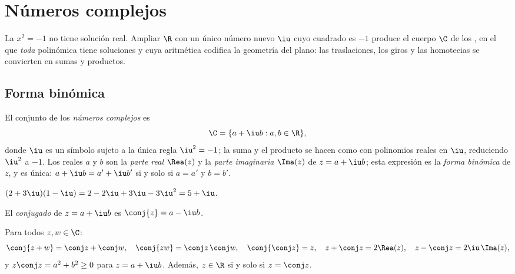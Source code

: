 \chapter{Números complejos}\label{ch:g12:complex}

La  $x^2 = -1$ no tiene solución real. Ampliar $\R$ con un único
número nuevo $\iu$ cuyo cuadrado es $-1$ produce el cuerpo $\C$ de los
, en el que \emph{toda}  polinómica tiene
soluciones y cuya aritmética codifica la geometría del plano: las
traslaciones, los giros y las homotecias se convierten en sumas y
productos.

\section{Forma binómica}

\begin{definition}\label{def:g12:complex:def}
El conjunto de los \emph{números complejos} es
\[
\C = \{a + \iu b : a, b \in \R\},
\]
donde $\iu$ es un símbolo sujeto a la única regla $\iu^2 = -1$; la suma y el
producto se hacen como con polinomios reales en $\iu$, reduciendo $\iu^2$ a
$-1$. Los reales $a$ y $b$ son la \emph{parte real}
$\Rea(z)$ y la \emph{parte imaginaria} $\Ima(z)$ de
$z = a + \iu b$; esta expresión es la \emph{forma binómica} de $z$, y es única: $a + \iu b = a' + \iu b'$ si y solo si
$a = a'$ y $b = b'$.
\end{definition}

\begin{example}
$(2 + 3\iu)(1 - \iu) = 2 - 2\iu + 3\iu - 3\iu^2 = 5 + \iu$.
\end{example}

\begin{definition}[Conjugado]\label{def:g12:complex:conjugate}
El \emph{conjugado} de $z = a + \iu b$ es
$\conj{z} = a - \iu b$.
\end{definition}

\begin{proposition}\label{prop:g12:complex:conjugate}
Para todos $z, w \in \C$:
\[
\conj{z + w} = \conj z + \conj w, \quad
\conj{zw} = \conj z\,\conj w, \quad
\conj{\conj z} = z, \quad
z + \conj z = 2\Rea(z), \quad
z - \conj z = 2\iu\,\Ima(z),
\]
y $z\conj z = a^2 + b^2 \geq 0$ para $z = a + \iu b$. Además, $z \in \R$ si
y solo si $z = \conj z$.
\end{proposition}

